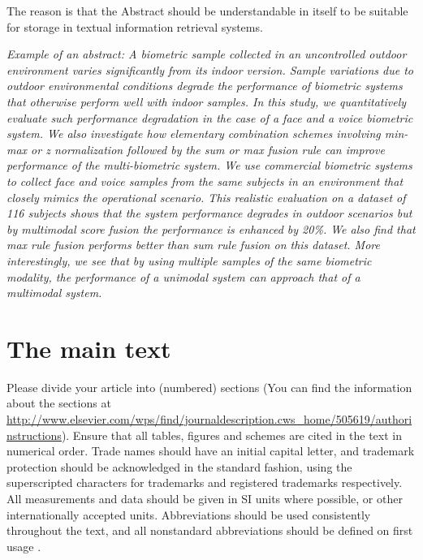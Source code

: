 \documentclass[times,twocolumn,final,authoryear]{elsarticle}
\begin{document}
The reason is that the Abstract should be understandable in itself to
be suitable for storage in textual information retrieval systems.

\textit{Example of an abstract: A biometric sample collected in an
uncontrolled outdoor environment varies significantly from its
indoor version. Sample variations due to outdoor environmental
conditions degrade the performance of biometric systems that
otherwise perform well with indoor samples. In this study, we
quantitatively evaluate such performance degradation in the case
of a face and a voice biometric system. We also investigate how
elementary combination schemes involving min-max or z
normalization followed by the sum or max fusion rule can
improve performance of the multi-biometric system. We use
commercial biometric systems to collect face and voice samples
from the same subjects in an environment that closely mimics the
operational scenario. This realistic evaluation on a dataset of
116 subjects shows that the system performance degrades in
outdoor scenarios but by multimodal score fusion the
performance is enhanced by 20\%. We also find that max rule
fusion performs better than sum rule fusion on this dataset. More
interestingly, we see that by using multiple samples of the same
biometric modality, the performance of a unimodal system can
approach that of a multimodal system.}

\section{The main text}

Please divide your article into (numbered) sections (You can find the
information about the sections at
\url{http://www.elsevier.com/wps/find/journaldescription.cws_home/505619/authorinstructions}).
Ensure that all tables, figures and schemes are cited in the text in
numerical order. Trade names should have an initial capital letter, and
trademark protection should be acknowledged in the standard fashion,
using the superscripted characters for trademarks and registered
trademarks respectively. All measurements and data should be given in
SI units where possible, or other internationally accepted units.
Abbreviations should be used consistently throughout the text, and all
nonstandard abbreviations should be defined on first usage
\citep{vanderGeeretal2000}.
\end{document}
